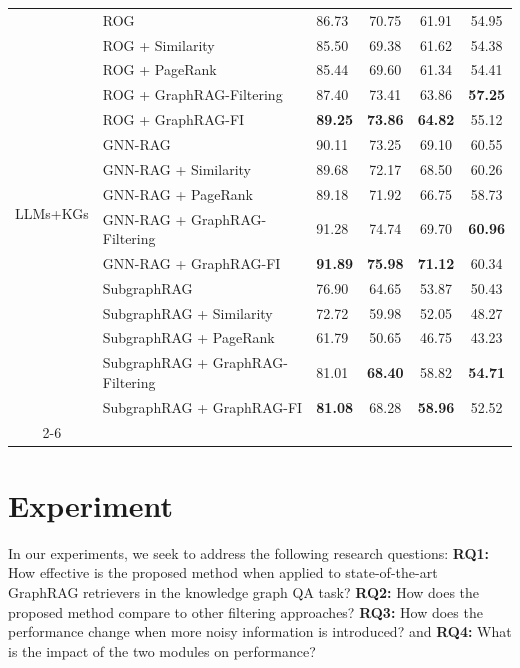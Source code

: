 \documentclass[11pt]{article}
\begin{document}
\begin{table}[ht]
\begin{tabular}{c|llccc}
\multirow{15}{*}{LLMs+KGs}
 & ROG & 86.73 & 70.75 & 61.91 & 54.95 \\
  & ROG + Similarity & 85.50 & 69.38 & 61.62 & 54.38\\
  & ROG + PageRank & 85.44 & 69.60 & 61.34 & 54.41\\
  & ROG + GraphRAG-Filtering & 87.40 & 73.41 & 63.86 & \textbf{57.25}\\
  & ROG + GraphRAG-FI & \textbf{89.25} & \textbf{73.86} & \textbf{64.82} & 55.12\\ \cmidrule(lr){2-6} 
 & GNN-RAG & 90.11 & 73.25 & 69.10 & 60.55 \\
  & GNN-RAG + Similarity & 89.68 & 72.17 & 68.50 & 60.26\\
  & GNN-RAG + PageRank & 89.18 & 71.92 & 66.75 & 58.73\\
  & GNN-RAG + GraphRAG-Filtering & 91.28 & 74.74 & 69.70 & \textbf{60.96}\\
  & GNN-RAG + GraphRAG-FI & \textbf{91.89} & \textbf{75.98} & \textbf{71.12} & 60.34\\ \cmidrule(lr){2-6}
 & SubgraphRAG & 76.90 & 64.65 & 53.87 & 50.43\\
  & SubgraphRAG + Similarity & 72.72 & 59.98 & 52.05 & 48.27\\
  & SubgraphRAG + PageRank & 61.79 & 50.65 &46.75 & 43.23\\
  & SubgraphRAG + GraphRAG-Filtering & 81.01 & \textbf{68.40} & 58.82 & \textbf{54.71}\\
  & SubgraphRAG + GraphRAG-FI & \textbf{81.08} & 68.28 & \textbf{58.96} & 52.52\\ \cline{2-6}
 \hline
\end{tabular}
\end{table}
\section{Experiment}
In our experiments, we seek to address the following research questions:  
\textbf{RQ1:} How effective is the proposed method when applied to state-of-the-art GraphRAG retrievers in the knowledge graph QA task?  
\textbf{RQ2:} How does the proposed method compare to other filtering approaches?
\textbf{RQ3:} How does the performance change when more noisy information is introduced? and 
\textbf{RQ4:} What is the impact of the two modules on performance?
\end{document}
